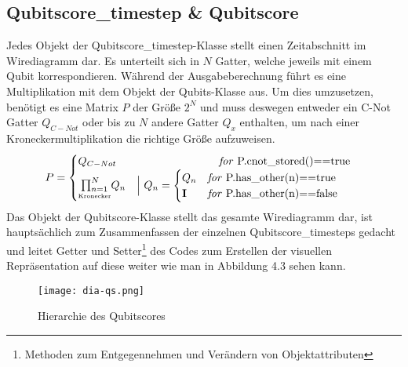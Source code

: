 \documentclass[12pt]{report}
\begin{document}
\subsection{Qubitscore\_timestep \& Qubitscore}
Jedes Objekt der \glqq Qubitscore\_timestep\grqq{}-Klasse stellt einen Zeitabschnitt im Wirediagramm dar. Es unterteilt sich in $N$ Gatter, welche jeweils mit einem Qubit korrespondieren. Während der Ausgabeberechnung führt es eine Multiplikation mit dem Objekt der \glqq Qubits\grqq{}-Klasse aus.
Um dies umzusetzen, benötigt es eine Matrix $P$ der Größe $2^N$ und muss deswegen entweder ein C-Not Gatter $Q_{C-Not}$ oder bis zu $N$ andere Gatter $Q_x$ enthalten, um nach einer Kroneckermultiplikation die richtige Größe aufzuweisen.
\begin{align}
P &=
  \begin{cases}
    Q_{C-Not} & \hspace{2.64cm} \text{\textit{for} P.cnot\_stored()==true}\\
    \begin{matrix}
    	\vspace{-0.25cm}\\
    	\prod_{n=1}^{N}\vspace{-0.2cm}\\
    	\text{\tiny{Kronecker}}
    \end{matrix}
    Q_{n} &\Big{\vert~}Q_{n}=
    \begin{cases}
      Q_{n} & \text{\textit{for} P.has\_other(n)==true}\\
      \textbf{I} & \text{\textit{for} P.has\_other(n)==false}
    \end{cases}
  \end{cases}
\end{align}
Das Objekt der \glqq Qubitscore\grqq{}-Klasse stellt das gesamte Wirediagramm dar, ist hauptsächlich zum Zusammenfassen der einzelnen Qubitscore\_timesteps gedacht und leitet \glqq Getter\grqq{} und \glqq Setter\grqq\footnote{Methoden zum Entgegennehmen und Verändern von Objektattributen} des Codes zum Erstellen der visuellen Repräsentation auf diese weiter wie man in Abbildung 4.3 sehen kann.
\begin{figure}%
\texttt{[image: dia-qs.png]}
\caption{Hierarchie des Qubitscores}
\end{figure}
\end{document}

